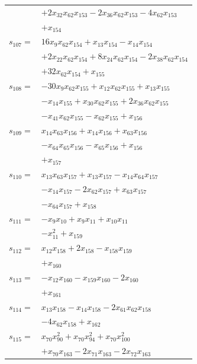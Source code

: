 \begin{longtable}{@{}r@{\;}l@{}}
 & \(\displaystyle +2x_{32}x_{62}x_{153} -2x_{36}x_{62}x_{153} -4x_{62}x_{153}\) \\
 & \(\displaystyle +x_{154}\) \\[3pt]
\(s_{107}=\) & \(\displaystyle 16x_{9}x_{62}x_{154} +x_{13}x_{154} -x_{14}x_{154}\) \\
 & \(\displaystyle +2x_{22}x_{62}x_{154} +8x_{24}x_{62}x_{154} -2x_{38}x_{62}x_{154}\) \\
 & \(\displaystyle +32x_{62}x_{154} +x_{155}\) \\[3pt]
\(s_{108}=\) & \(\displaystyle -30x_{9}x_{62}x_{155} +x_{12}x_{62}x_{155} +x_{13}x_{155}\) \\
 & \(\displaystyle -x_{14}x_{155} +x_{30}x_{62}x_{155} +2x_{36}x_{62}x_{155}\) \\
 & \(\displaystyle -x_{41}x_{62}x_{155} -x_{62}x_{155} +x_{156}\) \\[3pt]
\(s_{109}=\) & \(\displaystyle x_{14}x_{63}x_{156} +x_{14}x_{156} +x_{63}x_{156}\) \\
 & \(\displaystyle -x_{64}x_{65}x_{156} -x_{65}x_{156} +x_{156}\) \\
 & \(\displaystyle +x_{157}\) \\[3pt]
\(s_{110}=\) & \(\displaystyle x_{13}x_{63}x_{157} +x_{13}x_{157} -x_{14}x_{64}x_{157}\) \\
 & \(\displaystyle -x_{14}x_{157} -2x_{62}x_{157} +x_{63}x_{157}\) \\
 & \(\displaystyle -x_{64}x_{157} +x_{158}\) \\[3pt]
\(s_{111}=\) & \(\displaystyle -x_{9}x_{10} +x_{9}x_{11} +x_{10}x_{11}\) \\
 & \(\displaystyle -x_{11}^{2} +x_{159}\) \\[3pt]
\(s_{112}=\) & \(\displaystyle x_{12}x_{158} +2x_{158} -x_{158}x_{159}\) \\
 & \(\displaystyle +x_{160}\) \\[3pt]
\(s_{113}=\) & \(\displaystyle -x_{12}x_{160} -x_{159}x_{160} -2x_{160}\) \\
 & \(\displaystyle +x_{161}\) \\[3pt]
\(s_{114}=\) & \(\displaystyle x_{13}x_{158} -x_{14}x_{158} -2x_{61}x_{62}x_{158}\) \\
 & \(\displaystyle -4x_{62}x_{158} +x_{162}\) \\[3pt]
\(s_{115}=\) & \(\displaystyle x_{70}x_{90}^{2} +x_{70}x_{94}^{2} +x_{70}x_{100}^{2}\) \\
 & \(\displaystyle +x_{70}x_{163} -2x_{71}x_{163} -2x_{72}x_{163}\) \\

\end{longtable}
